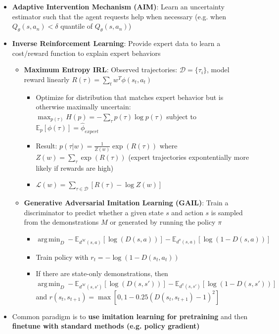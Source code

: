 \documentclass[twocolumn]{article}
\providecommand{\tightlist}{%
  \setlength{\itemsep}{\GlobalItemSep}\setlength{\parskip}{\GlobalListParSkip}}
\newlength{\GlobalItemSep}
\newlength{\GlobalListParSkip}
\DeclareMathOperator*{\argmin}{arg\,min}
\begin{document}
\begin{itemize}
  \begin{itemize}
  \tightlist
  \item
    \(L(\pi) = \mathbb{E}_{s, a^+, a^-} [\log \sigma (\beta \log \frac{\pi(a^+ | s)}{\pi (a^- | s)})]\)
  \end{itemize}
\item
  \textbf{Adaptive Intervention Mechanism (AIM)}: Learn an uncertainty
  estimator such that the agent requests help when necessary (e.g. when
  \(Q_\theta (s, a_n) < \delta\) quantile of \(Q_\theta(s, a_n)\))
\item
  \textbf{Inverse Reinforcement Learning}: Provide expert data to learn
  a cost/reward function to explain expert behaviors

  \begin{itemize}
  \tightlist
  \item
    \textbf{Maximum Entropy IRL}: Observed trajectories:
    \(\mathcal{D} = \{\tau_i\}\), model reward linearly
    \(R(\tau) = \sum_t w^T \phi(s_t, a_t)\)

    \begin{itemize}
    \tightlist
    \item
      Optimize for distribution that matches expert behavior but is
      otherwise maximally uncertain:
      \(\max_{p(\tau)} H(p) = - \sum_\tau p(\tau) \log p(\tau)\) subject
      to \(\mathbb{E}_p [\phi(\tau)] = \hat{\phi}_{expert}\)
    \item
      Result: \(p(\tau | w) = \frac{1}{Z(w)}\exp(R(\tau))\) where
      \(Z(w) = \sum_\tau \exp(R(\tau))\) (expert trajectories
      expontentially more likely if rewards are high)
    \item
      \(\mathcal{L} (w) = \sum_{\tau \in \mathcal{D}}[R(\tau) - \log Z(w)]\)
    \end{itemize}
  \item
    \textbf{Generative Adversarial Imitation Learning (GAIL)}: Train a
    discriminator to predict whether a given state \(s\) and action
    \(s\) is sampled from the demonstrations \(M\) or generated by
    running the policy \(\pi\)

    \begin{itemize}
    \tightlist
    \item
      \(\argmin_D - \mathbb{E}_{d^{\mathcal{M}}(s, a)}[\log (D(s,a))] - \mathbb{E}_{d^\pi (s,a)}[\log (1 - D(s,a))]\)
    \item
      Train policy with \(r_t = -\log (1 - D(s_t, a_t))\)
    \item
      If there are state-only demonstrations, then
      \(\argmin_D - \mathbb{E}_{d^{\mathcal{M}}(s, s')}[\log (D(s, s'))] - \mathbb{E}_{d^\pi (s, s')}[\log (1 - D(s, s'))]\)
      and
      \(r(s_t, s_{t+1}) = \max [0, 1 - 0.25 (D(s_t, s_{t+1}) - 1)^2]\)
    \end{itemize}
  \end{itemize}
\item
  Common paradigm is to \textbf{use imitation learning for pretraining}
  and then \textbf{finetune with standard methods (e.g. policy
  gradient)}


\end{itemize}
\end{document}

